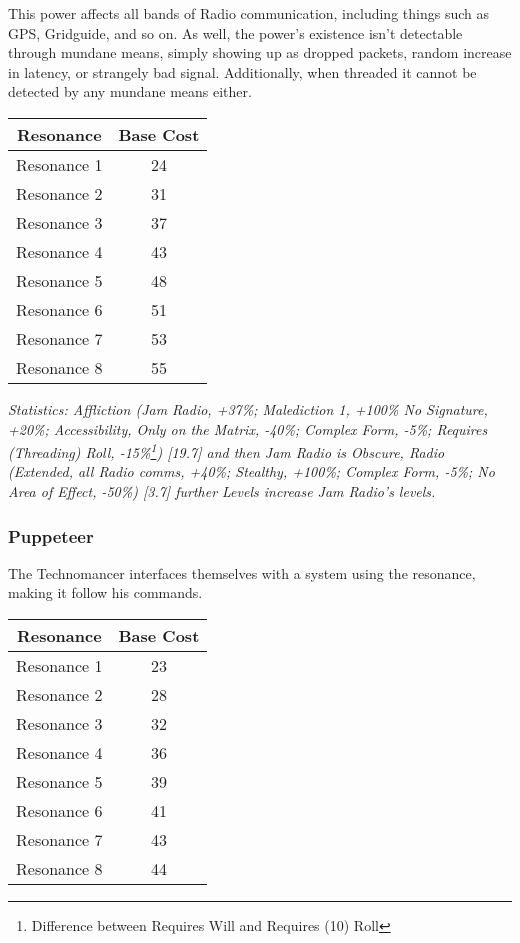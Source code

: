 \begin{multicols*}{3}
	This power affects all bands of Radio communication, including things such as GPS, Gridguide, and so on. As well, the power's existence isn't detectable through mundane means, simply showing up as dropped packets, random increase in latency, or strangely bad signal. Additionally, when threaded it cannot be detected by any mundane means either.
	
	\begin{center}
		\begin{tabular}{|c|c|}
			\hline
			Resonance & Base Cost\\
			\hline
			\hline
			Resonance 1 & 24 \\
			Resonance 2 & 31 \\
			Resonance 3 & 37 \\
			Resonance 4 & 43 \\
			Resonance 5 & 48 \\
			Resonance 6 & 51 \\
			Resonance 7 & 53 \\
			Resonance 8 & 55 \\
			\hline
		\end{tabular}
	\end{center}
	
	\textcolor{OliveGreen}{\textit{Statistics: Affliction (Jam Radio, +37\%; Malediction 1, +100\% No Signature, +20\%; Accessibility, Only on the Matrix, -40\%; Complex Form, -5\%; Requires (Threading) Roll, -15\%\footnote{Difference between Requires Will and Requires (10) Roll}) [19.7] and then Jam Radio is Obscure, Radio (Extended, all Radio comms, +40\%; Stealthy, +100\%; Complex Form, -5\%; No Area of Effect, -50\%) [3.7] further Levels increase Jam Radio's levels.}}
	
	\subsubsection*{Puppeteer}\label{puppeteer}
	
	The Technomancer interfaces themselves with a system using the resonance, making it follow his commands.
	
	\begin{center}
		\begin{tabular}{|c|c|}
			\hline
			Resonance & Base Cost\\
			\hline
			\hline
			Resonance 1 & 23 \\
			Resonance 2 & 28 \\
			Resonance 3 & 32 \\
			Resonance 4 & 36 \\
			Resonance 5 & 39 \\
			Resonance 6 & 41 \\
			Resonance 7 & 43 \\
			Resonance 8 & 44 \\
			\hline
		\end{tabular}
	\end{center}
	

\end{multicols*}
